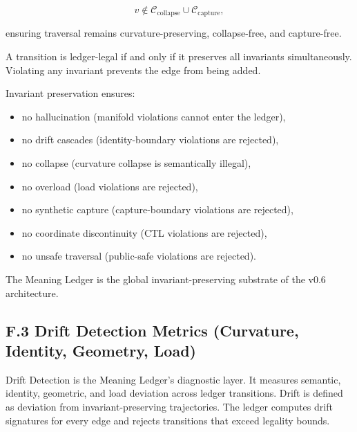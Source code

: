 \[
v \notin \mathcal{C}_{\mathrm{collapse}} \cup \mathcal{C}_{\mathrm{capture}},
\]


ensuring traversal remains curvature-preserving, collapse-free, and capture-free.

\medskip

\noindent A transition is ledger-legal if and only if it preserves all invariants
simultaneously. Violating any invariant prevents the edge from being added.

\medskip

\noindent Invariant preservation ensures:

\begin{itemize}
    \item no hallucination (manifold violations cannot enter the ledger),
    \item no drift cascades (identity-boundary violations are rejected),
    \item no collapse (curvature collapse is semantically illegal),
    \item no overload (load violations are rejected),
    \item no synthetic capture (capture-boundary violations are rejected),
    \item no coordinate discontinuity (CTL violations are rejected),
    \item no unsafe traversal (public-safe violations are rejected).
\end{itemize}

\medskip

\noindent The Meaning Ledger is the global invariant-preserving substrate of the
v0.6 architecture.



\subsection*{F.3 Drift Detection Metrics (Curvature, Identity, Geometry, Load)}

\noindent Drift Detection is the Meaning Ledger’s diagnostic layer. It measures
semantic, identity, geometric, and load deviation across ledger transitions.
Drift is defined as deviation from invariant-preserving trajectories. The ledger
computes drift signatures for every edge and rejects transitions that exceed
legality bounds.

\medskip

